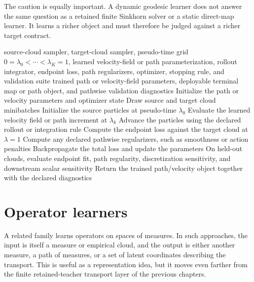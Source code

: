The caution is equally important.  A dynamic geodesic learner does not answer
the same question as a retained finite Sinkhorn solver or a static direct-map
learner.  It learns a richer object and must therefore be judged against a
richer target contract.

\begin{algorithm}[ht]
\caption{\texttt{train\_dynamic\_transport\_path}}
\begin{algorithmic}[1]
\Require source-cloud sampler, target-cloud sampler, pseudo-time grid \(0=\lambda_0<\cdots<\lambda_K=1\), learned velocity-field or path parameterization, rollout integrator, endpoint loss, path regularizers, optimizer, stopping rule, and validation suite
\Ensure trained path or velocity-field parameters, deployable terminal map or path object, and pathwise validation diagnostics
\State Initialize the path or velocity parameters and optimizer state
  \State Draw source and target cloud minibatches
  \State Initialize the source particles at pseudo-time \(\lambda_0\)
    \State Evaluate the learned velocity field or path increment at \(\lambda_k\)
    \State Advance the particles using the declared rollout or integration rule
  \EndFor
  \State Compute the endpoint loss against the target cloud at \(\lambda=1\)
  \State Compute any declared pathwise regularizers, such as smoothness or action penalties
  \State Backpropagate the total loss and update the parameters
\EndWhile
\State On held-out clouds, evaluate endpoint fit, path regularity, discretization sensitivity, and downstream scalar sensitivity
\State Return the trained path/velocity object together with the declared diagnostics
\end{algorithmic}
\end{algorithm}

\section{Operator learners}
\label{sec:bf-neural-ot-dynamic-operator}

A related family learns operators on spaces of measures.  In such approaches,
the input is itself a measure or empirical cloud, and the output is either
another measure, a path of measures, or a set of latent coordinates describing
the transport.  This is useful as a representation idea, but it moves even
farther from the finite retained-teacher transport layer of the previous
chapters.

